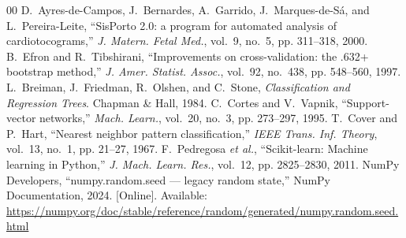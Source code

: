 \documentclass[conference]{IEEEtran}
\begin{document}
\begin{thebibliography}{00}
 D.~Ayres-de-Campos, J.~Bernardes, A.~Garrido, J.~Marques-de-S\'a, and L.~Pereira-Leite, ``SisPorto 2.0: a program for automated analysis of cardiotocograms,'' \emph{J. Matern. Fetal Med.}, vol.~9, no.~5, pp. 311--318, 2000.
 B.~Efron and R.~Tibshirani, ``Improvements on cross-validation: the .632+ bootstrap method,'' \emph{J. Amer. Statist. Assoc.}, vol.~92, no.~438, pp. 548--560, 1997.
 L.~Breiman, J.~Friedman, R.~Olshen, and C.~Stone, \emph{Classification and Regression Trees}. Chapman \& Hall, 1984.
 C.~Cortes and V.~Vapnik, ``Support-vector networks,'' \emph{Mach. Learn.}, vol.~20, no.~3, pp. 273--297, 1995.
 T.~Cover and P.~Hart, ``Nearest neighbor pattern classification,'' \emph{IEEE Trans. Inf. Theory}, vol.~13, no.~1, pp. 21--27, 1967.
 F.~Pedregosa \emph{et al.}, ``Scikit-learn: Machine learning in Python,'' \emph{J. Mach. Learn. Res.}, vol.~12, pp. 2825--2830, 2011.
 NumPy Developers, ``numpy.random.seed --- legacy random state,'' NumPy Documentation, 2024. [Online]. Available: \url{https://numpy.org/doc/stable/reference/random/generated/numpy.random.seed.html}
\end{thebibliography}
\end{document}
